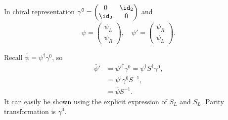 In chiral representation $\gamma^0 = \begin{pmatrix} 0 & \id_2 \\ \id_2 & 0 \end{pmatrix}$ and 
\begin{align*}
\psi = \begin{pmatrix} \psi_L \\ \psi_R\end{pmatrix}, \quad
\psi' = \begin{pmatrix} \psi_R \\ \psi_L \end{pmatrix}.
\end{align*}

Recall $\bar{\psi} = \psi^\dagger \gamma^0$, so
\begin{align*}
   \bar{\psi}' &= \psi'^\dagger \gamma^0 = \psi^\dagger S^\dagger \gamma^0, \\
               &= \psi^\dagger \gamma^0 S^{-1}, \\
               &= \bar{\psi} S^{-1}.
\end{align*}
It can easily be shown using the explicit expression of $S_L$ and $S_L$. Parity transformation is $\gamma^0$.

